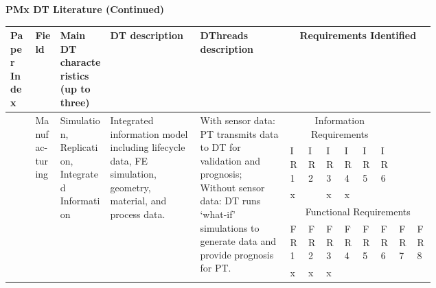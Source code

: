 \documentclass[runningheads]{llncs}
\begin{document}
\begin{landscape}
\begin{small}
\begin{longtable}
        


\end{longtable}
\end{small}

\newpage
        \textbf{PMx DT Literature (Continued)}
        \vspace{2mm}
        
        \begin{small}
    \begin{longtable}{p{0.05\linewidth}p{0.05\linewidth}p{0.1\linewidth}p{0.18\linewidth}p{0.18\linewidth}p{0.02\linewidth}p{0.02\linewidth}p{0.02\linewidth}p{0.02\linewidth}p{0.02\linewidth}p{0.02\linewidth}p{0.02\linewidth}p{0.02\linewidth}}
    \bottomrule

    
        Paper Index & Field & Main DT characteristics (up to three) & DT description & DThreads description & \multicolumn{8}{c}{Requirements Identified} \\\bottomrule
        
        \vspace{3mm}
        \multirow{6}{=}{\cite{werner2019twin}} & \multirow{6}{=}{Manufac-turing} &  \multirow{6}{=}{Simulation, Replication, Integrated Information} & \multirow{6}{=}{Integrated information model including lifecycle data, FE simulation, geometry, material, and process data.} & \multirow{6}{=}{With sensor data: PT transmits data to DT for validation and prognosis; Without sensor data: DT runs `what-if' simulations to generate data and provide prognosis for PT.} & \multicolumn{6}{c}{Information Requirements} &  \\\cmidrule{6-11}
        & & & & & IR1 & IR2 & IR3 & IR4 & IR5 & IR6 & & \\\cmidrule{6-11}
        & & & & & x &  & x & x &  &  & & \\\cmidrule{6-13}
        \vspace{3mm}
        & & & & & \multicolumn{8}{c}{Functional Requirements} \\\cmidrule{6-13}
        & & & & & FR1 & FR2 & FR3 & FR4 & FR5 & FR6 & FR7 & FR8 \\\cmidrule{6-13}
        & & & & & x & x & x &  &  &  & & \\\bottomrule


\end{longtable}
\end{small}
\end{landscape}
\end{document}

